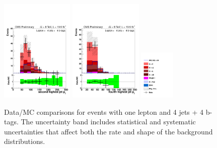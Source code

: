 \begin{figure}[hbtp]
\begin{center}
   \includegraphics[width=0.31\textwidth]{Figures/Analysis_2_Diagrams/LJ_plots_lep/4j4t/lep_jet_pt_2_4j4t_cumulative_wRatio_noLegend_lin.pdf}
   \includegraphics[width=0.31\textwidth]{Figures/Analysis_2_Diagrams/LJ_plots_lep/4j4t/lep_jet_pt_4_4j4t_cumulative_wRatio_noLegend_lin.pdf}
   \includegraphics[width=0.15\textwidth]{Figures/Analysis_2_Diagrams/LJ_plots_lep/ttH_legend_1columns.pdf}
   \caption{Data/MC comparisons for events with one lepton and 4 jets + 4 b-tags.  The uncertainty band includes statistical and systematic uncertainties that affect both the rate and shape of the background distributions.}
   \label{fig:lj_input_II_4j4t}
 \end{center}
\end{figure}

\clearpage


